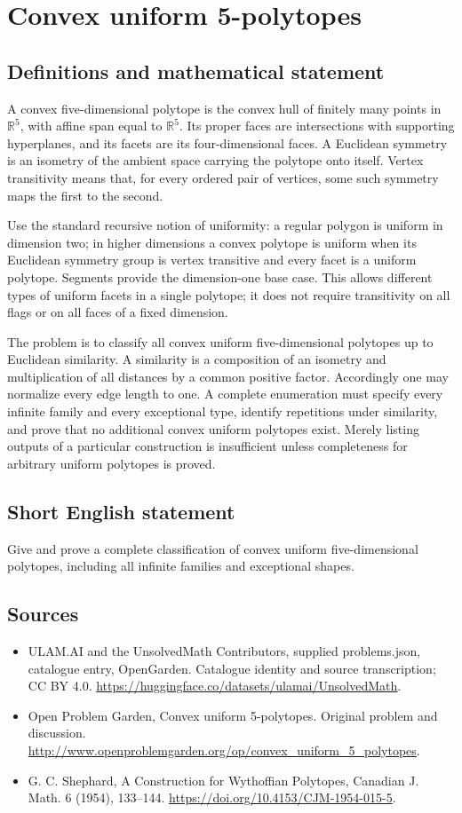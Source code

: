 \documentclass[11pt,a4paper]{article}
\begin{document}
\section*{Convex uniform 5-polytopes}\label{statement}

\subsection{Definitions and mathematical statement}
A convex five-dimensional polytope is the convex hull of finitely many points in $\mathbb R^5$, with affine span equal to $\mathbb R^5$. Its proper faces are intersections with supporting hyperplanes, and its facets are its four-dimensional faces. A Euclidean symmetry is an isometry of the ambient space carrying the polytope onto itself. Vertex transitivity means that, for every ordered pair of vertices, some such symmetry maps the first to the second.

Use the standard recursive notion of uniformity: a regular polygon is uniform in dimension two; in higher dimensions a convex polytope is uniform when its Euclidean symmetry group is vertex transitive and every facet is a uniform polytope. Segments provide the dimension-one base case. This allows different types of uniform facets in a single polytope; it does not require transitivity on all flags or on all faces of a fixed dimension.

The problem is to classify all convex uniform five-dimensional polytopes up to Euclidean similarity. A similarity is a composition of an isometry and multiplication of all distances by a common positive factor. Accordingly one may normalize every edge length to one. A complete enumeration must specify every infinite family and every exceptional type, identify repetitions under similarity, and prove that no additional convex uniform polytopes exist. Merely listing outputs of a particular construction is insufficient unless completeness for arbitrary uniform polytopes is proved.
\subsection{Short English statement}
Give and prove a complete classification of convex uniform five-dimensional polytopes, including all infinite families and exceptional shapes.
\subsection{Sources}
\begin{itemize}
\item[S1] ULAM.AI and the UnsolvedMath Contributors, supplied problems.json, catalogue entry, OpenGarden. Catalogue identity and source transcription; CC BY 4.0.
\url{https://huggingface.co/datasets/ulamai/UnsolvedMath}.
\item[S2] Open Problem Garden, Convex uniform 5-polytopes. Original problem and discussion.
\url{http://www.openproblemgarden.org/op/convex_uniform_5_polytopes}.
\item[S3] G. C. Shephard, A Construction for Wythoffian Polytopes, Canadian J. Math. 6 (1954), 133--144.
\url{https://doi.org/10.4153/CJM-1954-015-5}.
\end{itemize}
\end{document}
